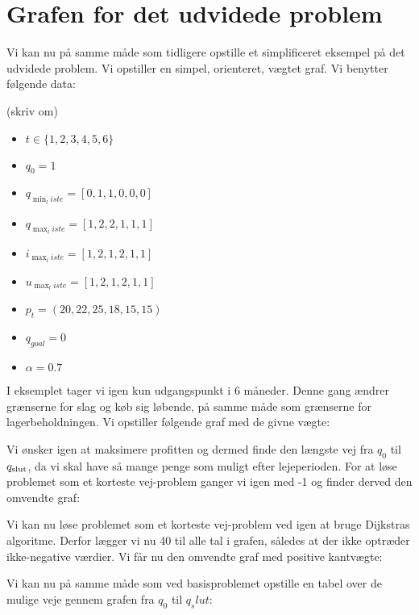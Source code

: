 \section{Grafen for det udvidede problem} \label{kap:grafen_for_udvidet}
Vi kan nu på samme måde som tidligere opstille et simplificeret eksempel på det udvidede problem. Vi opstiller en simpel, orienteret, vægtet graf. Vi benytter følgende data:

(skriv om)
\begin{itemize}
  \item $t \in \{1,2,3,4,5,6\}$
  \item $q_{0}=1$
  \item $q_{\min_liste}=[0,1,1,0,0,0]$
  \item $q_{\max_liste}=[1,2,2,1,1,1]$
  \item $i_{\max_liste}=[1,2,1,2,1,1]$
  \item $u_{\max_liste}=[1,2,1,2,1,1]$
  \item $p_{t}=(20,22,25,18,15,15)$
  \item $q_{goal}=0$
  \item $\alpha=0.7$
\end{itemize}

I eksemplet tager vi igen kun udgangspunkt i 6 måneder. Denne gang ændrer grænserne for slag og køb sig løbende, på samme måde som grænserne for lagerbeholdningen. Vi opstiller følgende graf med de givne vægte:



Vi ønsker igen at maksimere profitten og dermed finde den længste vej fra $q_{0}$ til $q_{\textrm{slut}}$, da vi skal have så mange penge som muligt efter lejeperioden. For at løse problemet som et korteste vej-problem ganger vi igen med -1 og finder derved den omvendte graf:



Vi kan nu løse problemet som et korteste vej-problem ved igen at bruge Dijkstras algoritme. Derfor lægger vi nu 40 til alle tal i grafen, således at der ikke optræder ikke-negative værdier. Vi får nu den omvendte graf med positive kantvægte:




Vi kan nu på samme måde som ved basisproblemet opstille en tabel over de mulige veje gennem grafen fra $q_0$ til $q_slut$:

 


